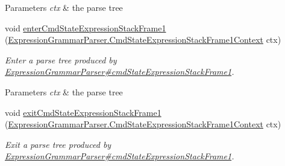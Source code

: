 \begin{DoxyCompactItemize}
\begin{DoxyCompactList}
\begin{DoxyParams}{Parameters}
{\em ctx} & the parse tree\\
\hline
\end{DoxyParams}
 \end{DoxyCompactList}\item 
void \hyperlink{classgov_1_1nasa_1_1jpf_1_1inspector_1_1server_1_1expression_1_1parser_1_1_expression_grammar_base_listener_a079a2ca8cf4db7623b88a8a30d5d3b55}{enter\+Cmd\+State\+Expression\+Stack\+Frame1} (\hyperlink{classgov_1_1nasa_1_1jpf_1_1inspector_1_1server_1_1expression_1_1parser_1_1_expression_grammar_pabec1adacda521b9e6ed9ea64caf537b4}{Expression\+Grammar\+Parser.\+Cmd\+State\+Expression\+Stack\+Frame1\+Context} ctx)
\begin{DoxyCompactList}\small\item\em Enter a parse tree produced by \hyperlink{classgov_1_1nasa_1_1jpf_1_1inspector_1_1server_1_1expression_1_1parser_1_1_expression_grammar_parser_a7b51fc0f0baff269b98a4705322e2242}{Expression\+Grammar\+Parser\#cmd\+State\+Expression\+Stack\+Frame1}.


\begin{DoxyParams}{Parameters}
{\em ctx} & the parse tree\\
\hline
\end{DoxyParams}
 \end{DoxyCompactList}\item 
void \hyperlink{classgov_1_1nasa_1_1jpf_1_1inspector_1_1server_1_1expression_1_1parser_1_1_expression_grammar_base_listener_a891f65689467b8dd7511fad804e00433}{exit\+Cmd\+State\+Expression\+Stack\+Frame1} (\hyperlink{classgov_1_1nasa_1_1jpf_1_1inspector_1_1server_1_1expression_1_1parser_1_1_expression_grammar_pabec1adacda521b9e6ed9ea64caf537b4}{Expression\+Grammar\+Parser.\+Cmd\+State\+Expression\+Stack\+Frame1\+Context} ctx)
\begin{DoxyCompactList}\small\item\em Exit a parse tree produced by \hyperlink{classgov_1_1nasa_1_1jpf_1_1inspector_1_1server_1_1expression_1_1parser_1_1_expression_grammar_parser_a7b51fc0f0baff269b98a4705322e2242}{Expression\+Grammar\+Parser\#cmd\+State\+Expression\+Stack\+Frame1}.



\end{DoxyCompactList}
\end{DoxyCompactItemize}
